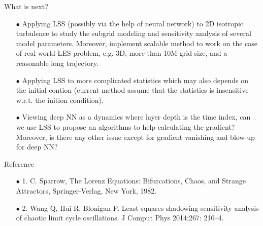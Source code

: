 \documentclass{beamer}
\begin{document}
\begin{frame}{What is next?}
	\begin{itemize}
		\item[$\bullet$] Applying LSS (possibly via the help of neural network) to 2D isotropic turbulence to study the subgrid modeling and 
		sensitivity analysis of several model parameters. Moreover, implement scalable 
		method to work on the case of real world LES problem, e.g. 3D, more than 10M grid size, 
		and a reasonable long trajectory.
		\item[$\bullet$] Applying LSS to more complicated statistics which may also depends on the 
		initial contion (current method assume that the statistics is insensitive w.r.t. the
		inition condition).
		\item[$\bullet$] {\color{red}Viewing deep NN as a dynamics where layer depth is the time index, can we use 
		LSS to propose an algorithms to help calculating the gradient? Moreover, is there any other issue except
		for gradient vanishing and blow-up for deep NN?}
	\end{itemize}
\end{frame}

\begin{frame}{Reference}
	\begin{itemize}
		\item[$\bullet$] 1. C. Sparrow, The Lorenz Equations: Bifurcations, Chaos, and Strange Attractors, Springer-Verlag, New York, 1982.
		\item[$\bullet$] 2. Wang Q, Hui R, Blonigan P. Least squares shadowing sensitivity analysis of chaotic limit cycle oscillations. J Comput Phys 2014;267: 210–4.
	\end{itemize}

\end{frame}
\end{document}
